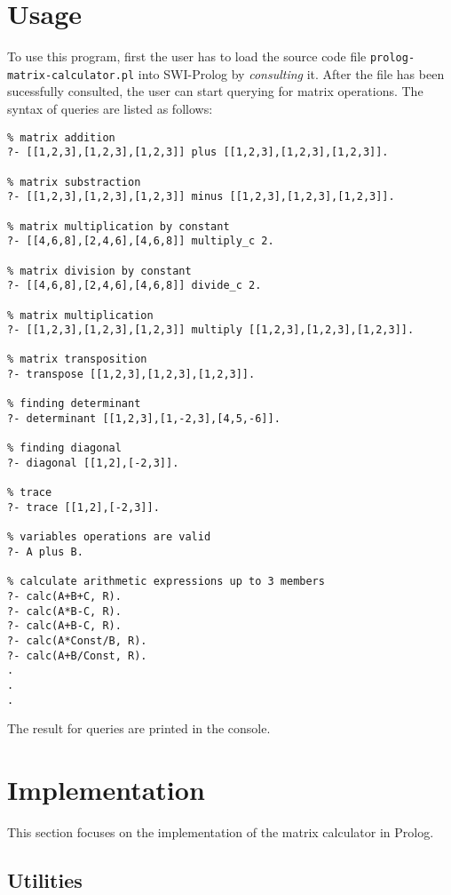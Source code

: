 \documentclass[a4paper]{article}
\begin{document}
\section{Usage} \label{usage}
To use this program, first the user has to load the source code file \texttt{prolog-matrix-calculator.pl} into SWI-Prolog by \textit{consulting} it. After the file has been sucessfully consulted, the user can start querying for matrix operations. The syntax of queries are listed as follows:

\begin{verbatim}
% matrix addition
?- [[1,2,3],[1,2,3],[1,2,3]] plus [[1,2,3],[1,2,3],[1,2,3]].

% matrix substraction
?- [[1,2,3],[1,2,3],[1,2,3]] minus [[1,2,3],[1,2,3],[1,2,3]].

% matrix multiplication by constant
?- [[4,6,8],[2,4,6],[4,6,8]] multiply_c 2.

% matrix division by constant
?- [[4,6,8],[2,4,6],[4,6,8]] divide_c 2.

% matrix multiplication
?- [[1,2,3],[1,2,3],[1,2,3]] multiply [[1,2,3],[1,2,3],[1,2,3]].

% matrix transposition
?- transpose [[1,2,3],[1,2,3],[1,2,3]].

% finding determinant
?- determinant [[1,2,3],[1,-2,3],[4,5,-6]].

% finding diagonal
?- diagonal [[1,2],[-2,3]].

% trace
?- trace [[1,2],[-2,3]].

% variables operations are valid
?- A plus B.

% calculate arithmetic expressions up to 3 members
?- calc(A+B+C, R).
?- calc(A*B-C, R).
?- calc(A+B-C, R).
?- calc(A*Const/B, R).
?- calc(A+B/Const, R).
.
.
.
\end{verbatim}

The result for queries are printed in the console.

\section{Implementation}
This section focuses on the implementation of the matrix calculator in Prolog.

\subsection{Utilities}
\end{document}
